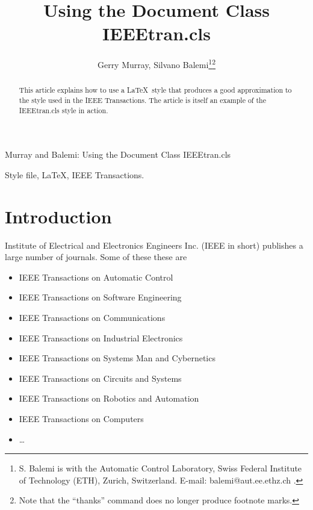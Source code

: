 \documentclass[twocolumn]{IEEEtran} %
\begin{document}
\title{Using the Document Class IEEEtran.cls} %

\author{Gerry Murray, Silvano Balemi\thanks{S. Balemi is with the
Automatic Control Laboratory, Swiss Federal Institute of Technology
(ETH), Zurich, Switzerland. E-mail: balemi@aut.ee.ethz.ch .}\thanks{Note
that the ``thanks'' command does no longer produce footnote marks.}}

{Murray and Balemi: Using the Document Class IEEEtran.cls} %


\maketitle

\begin{abstract}
This article explains how to use a \LaTeX\ style that produces a good
approximation to the style used in the IEEE Transactions.  The article
is itself an example of the IEEEtran.cls style in action.
\end{abstract}

\begin{keywords}
Style file, \LaTeX, IEEE Transactions.
\end{keywords}

\section{Introduction}
 Institute of Electrical and Electronics Engineers
Inc. (IEEE in short) publishes a large number of journals.  Some of
these these are

\begin{itemize}
\item IEEE Transactions on Automatic Control
\item IEEE Transactions on Software Engineering
\item IEEE Transactions on Communications
\item IEEE Transactions on Industrial Electronics
\item IEEE Transactions on Systems Man and Cybernetics
\item IEEE Transactions on Circuits and Systems
\item IEEE Transactions on Robotics and Automation
\item IEEE Transactions on Computers
\item \ldots{}
\end{itemize}
\end{document}
